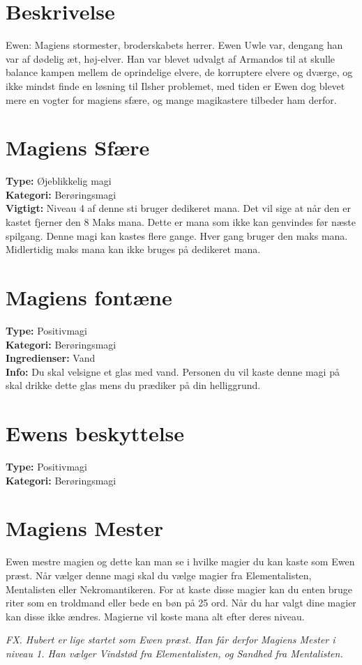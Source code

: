 \section{Beskrivelse}
Ewen: Magiens stormester, broderskabets herrer. Ewen Uwle var, dengang han var af dødelig æt,
høj-elver. Han var blevet udvalgt af Armandos til at skulle balance kampen mellem de oprindelige
elvere, de korruptere elvere og dværge, og ikke mindst finde en løsning til Ilsher problemet, med tiden
er Ewen dog blevet mere en vogter for magiens sfære, og mange magikastere tilbeder ham derfor.

\section{Magiens Sfære}
\textbf{Type:} Øjeblikkelig magi \\
\textbf{Kategori:} Berøringsmagi\\
\textbf{Vigtigt:} Niveau 4 af denne sti bruger dedikeret mana. Det vil sige at når den er kastet fjerner den 8 Maks mana. Dette er mana som ikke kan genvindes før næste spilgang. Denne magi kan kastes flere gange. Hver gang bruger den maks mana. Midlertidig maks mana kan ikke bruges på dedikeret mana.

\section{Magiens fontæne}
\textbf{Type:} Positivmagi\\
\textbf{Kategori:} Berøringsmagi\\
\textbf{Ingredienser:} Vand\\
\textbf{Info:} Du skal velsigne et glas med vand. Personen du vil kaste denne magi på skal drikke dette glas mens du prædiker på din helliggrund.

\section{Ewens beskyttelse}
\textbf{Type:} Positivmagi\\
\textbf{Kategori:} Berøringsmagi\\

\section{Magiens Mester}
Ewen mestre magien og dette kan man se i hvilke magier du kan kaste som Ewen præst. Når vælger denne magi skal du vælge magier fra Elementalisten, Mentalisten eller Nekromantikeren. For at kaste disse magier kan du enten bruge riter som en troldmand eller bede en bøn på 25 ord. Når du har valgt dine magier kan disse ikke ændres. Magierne vil koste mana alt efter deres niveau.

\textit{FX. Hubert er lige startet som Ewen præst. Han får derfor Magiens Mester i niveau 1. Han vælger Vindstød fra Elementalisten, og Sandhed fra Mentalisten.}

